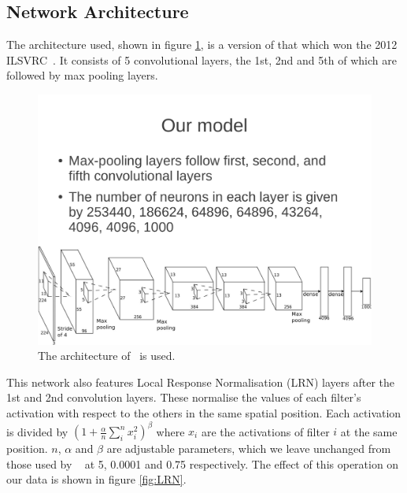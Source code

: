 \documentclass[11pt]{article} %
\begin{document}
\subsection{Network Architecture}



\label{sec:alexNet}

The architecture used, shown in figure \ref{fig:alexNet}, is a version of that which won the 2012 ILSVRC~\cite{Krizhevsky2012}. It consists of 5 convolutional layers, the 1st, 2nd and 5th of which are followed by max pooling layers. 

\begin{figure}
\centering
\includegraphics*[width=\linewidth,trim={0cm 0cm 0.79cm 12cm},clip]{alexNet} 
\caption{ The architecture of~\cite{Krizhevsky2012} is used.\label{fig:alexNet}}
\end{figure}



This network also features Local Response Normalisation (LRN) layers after the 1st and 2nd convolution layers. These normalise the values of each filter's activation with respect to the others in the same spatial position. Each activation is divided by $(1 + \frac{\alpha}{n} \sum_i^n x_i^2)^\beta$ where $x_i$ are the activations of filter $i$ at the same position. $n$, $\alpha$ and $\beta$ are adjustable parameters, which we leave unchanged from those used by ~\cite{Krizhevsky2012} at 5, 0.0001 and 0.75 respectively. The effect of this operation on our data is shown in figure \ref{fig:LRN}. 
\end{document}
